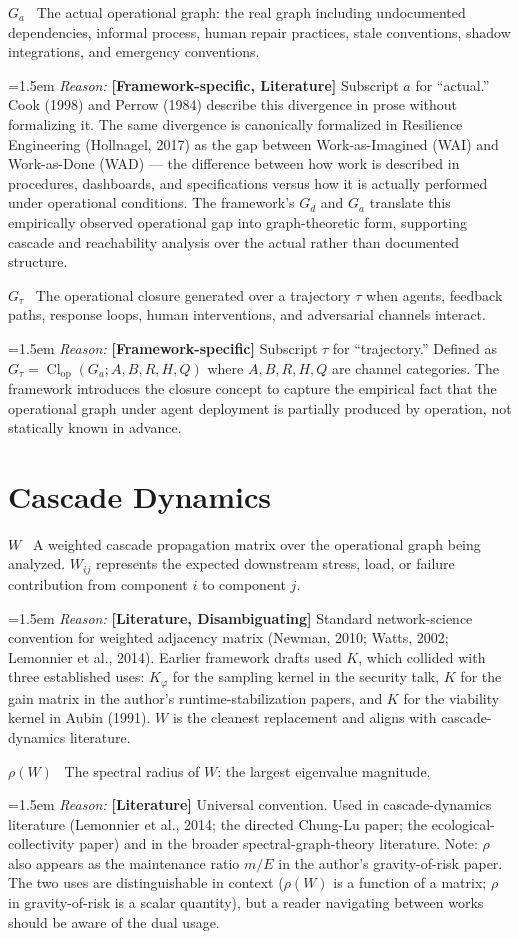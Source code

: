 \documentclass[11pt]{article}
\DeclareMathOperator{\Cl}{Cl}
\newcommand{\notation}[2]{%
  \par\smallskip
  \noindent\textbf{#1} \, #2\par
}
\newcommand{\reason}[2]{%
  \par\nopagebreak
  \begingroup
    \leftskip=1.5em
    \sloppy
    \noindent\textit{Reason:} \textbf{[#1]} #2\par
  \endgroup
  \par\smallskip
}
\begin{document}
\notation{$G_a$}{The actual operational graph: the real graph including undocumented dependencies, informal process, human repair practices, stale conventions, shadow integrations, and emergency conventions.}
\reason{Framework-specific, Literature}{Subscript $a$ for ``actual.'' Cook (1998) and Perrow (1984) describe this divergence in prose without formalizing it. The same divergence is canonically formalized in Resilience Engineering (Hollnagel, 2017) as the gap between Work-as-Imagined (WAI) and Work-as-Done (WAD) --- the difference between how work is described in procedures, dashboards, and specifications versus how it is actually performed under operational conditions. The framework's $G_d$ and $G_a$ translate this empirically observed operational gap into graph-theoretic form, supporting cascade and reachability analysis over the actual rather than documented structure.}

\notation{$G_\tau$}{The operational closure generated over a trajectory $\tau$ when agents, feedback paths, response loops, human interventions, and adversarial channels interact.}
\reason{Framework-specific}{Subscript $\tau$ for ``trajectory.'' Defined as $G_\tau = \Cl_{\text{op}}(G_a; A, B, R, H, Q)$ where $A, B, R, H, Q$ are channel categories. The framework introduces the closure concept to capture the empirical fact that the operational graph under agent deployment is partially produced by operation, not statically known in advance.}

\section{Cascade Dynamics}

\notation{$W$}{A weighted cascade propagation matrix over the operational graph being analyzed. $W_{ij}$ represents the expected downstream stress, load, or failure contribution from component $i$ to component $j$.}
\reason{Literature, Disambiguating}{Standard network-science convention for weighted adjacency matrix (Newman, 2010; Watts, 2002; Lemonnier et al., 2014). Earlier framework drafts used $K$, which collided with three established uses: $K_\varphi$ for the sampling kernel in the security talk, $K$ for the gain matrix in the author's runtime-stabilization papers, and $K$ for the viability kernel in Aubin (1991). $W$ is the cleanest replacement and aligns with cascade-dynamics literature.}

\notation{$\rho(W)$}{The spectral radius of $W$: the largest eigenvalue magnitude.}
\reason{Literature}{Universal convention. Used in cascade-dynamics literature (Lemonnier et al., 2014; the directed Chung-Lu paper; the ecological-collectivity paper) and in the broader spectral-graph-theory literature. Note: $\rho$ also appears as the maintenance ratio $m/E$ in the author's gravity-of-risk paper. The two uses are distinguishable in context ($\rho(W)$ is a function of a matrix; $\rho$ in gravity-of-risk is a scalar quantity), but a reader navigating between works should be aware of the dual usage.}
\end{document}
